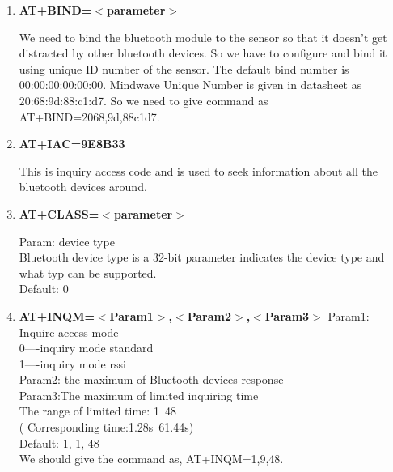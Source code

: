 \documentclass[12pt]{article}
\begin{document}
\begin{enumerate}
\begin{enumerate}
\begin{enumerate}
	\item \textbf{AT+BIND=$<$parameter$>$}

We need to bind the bluetooth module to the sensor so that it doesn’t get distracted by other bluetooth devices. So we have to configure and bind it using unique ID number of the sensor. The default bind number is 00:00:00:00:00:00. Mindwave Unique Number is given in datasheet as 20:68:9d:88:c1:d7. So we need to give command as AT+BIND=2068,9d,88c1d7.\\


	\item \textbf{AT+IAC=9E8B33}


This is inquiry access code and is used to seek information about all the bluetooth devices around.\\


	\item \textbf{AT+CLASS=$<$parameter$>$}


Param: device type\\
Bluetooth device type is a 32-bit parameter indicates the device type and what typ can be supported.\\
Default: 0\\ 

	\item \textbf{AT+INQM=$<$Param1$>$,$<$Param2$>$,$<$Param3$>$}
Param1: Inquire access mode\\
0----inquiry mode standard\\
1----inquiry mode rssi\\
Param2: the maximum of Bluetooth devices response\\
Param3:The maximum of limited inquiring time\\
The range of limited time: 1~48\\
( Corresponding time:1.28s~61.44s)\\
Default: 1, 1, 48\\
We should give the command as, AT+INQM=1,9,48.\\


\end{enumerate}
\end{enumerate}
\end{enumerate}
\end{document}
